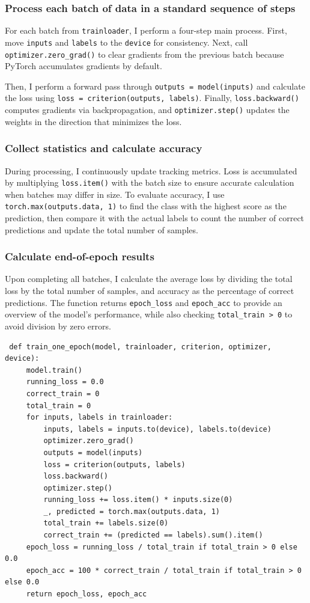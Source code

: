 \documentclass[12pt, a4paper, openany]{report}
\begin{document}
 \subsubsection*{Process each batch of data in a standard sequence of steps} %
 For each batch from \texttt{trainloader}, I perform a four-step main process. First, move \texttt{inputs} and \texttt{labels} to the \texttt{device} for consistency. Next, call \texttt{optimizer.zero\_grad()} to clear gradients from the previous batch because PyTorch accumulates gradients by default.

 Then, I perform a forward pass through \texttt{outputs = model(inputs)} and calculate the loss using \texttt{loss = criterion(outputs, labels)}. Finally, \texttt{loss.backward()} computes gradients via backpropagation, and \texttt{optimizer.step()} updates the weights in the direction that minimizes the loss.

 \subsubsection*{Collect statistics and calculate accuracy} %
 During processing, I continuously update tracking metrics. Loss is accumulated by multiplying \texttt{loss.item()} with the batch size to ensure accurate calculation when batches may differ in size.
 To evaluate accuracy, I use \texttt{torch.max(outputs.data, 1)} to find the class with the highest score as the prediction, then compare it with the actual labels to count the number of correct predictions and update the total number of samples.

 \subsubsection*{Calculate end-of-epoch results} %
 Upon completing all batches, I calculate the average loss by dividing the total loss by the total number of samples, and accuracy as the percentage of correct predictions. The function returns \texttt{epoch\_loss} and \texttt{epoch\_acc} to provide an overview of the model's performance, while also checking \texttt{total\_train > 0} to avoid division by zero errors.

 \begin{verbatim}
 def train_one_epoch(model, trainloader, criterion, optimizer, device):
     model.train()
     running_loss = 0.0
     correct_train = 0
     total_train = 0
     for inputs, labels in trainloader:
         inputs, labels = inputs.to(device), labels.to(device)
         optimizer.zero_grad()
         outputs = model(inputs)
         loss = criterion(outputs, labels)
         loss.backward()
         optimizer.step()
         running_loss += loss.item() * inputs.size(0)
         _, predicted = torch.max(outputs.data, 1)
         total_train += labels.size(0)
         correct_train += (predicted == labels).sum().item()
     epoch_loss = running_loss / total_train if total_train > 0 else 0.0
     epoch_acc = 100 * correct_train / total_train if total_train > 0 else 0.0
     return epoch_loss, epoch_acc
 \end{verbatim}
\end{document}
